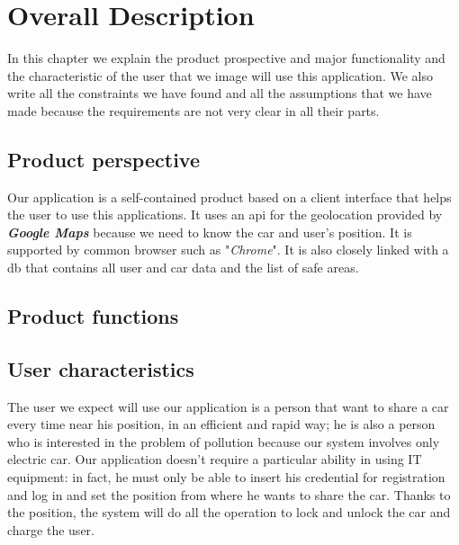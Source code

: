 \section{Overall Description} \label{sec:description}
In this chapter we explain the product prospective and major functionality and the characteristic of the user that we image will use this application. We also write all the constraints we have found and all the assumptions that we have made because the requirements are not very clear in all their parts. 

\subsection{Product perspective} \label{subsec:prod_persp}
Our application is a self-contained product based on a client interface that helps the user to use this applications. It uses an \acs{api} for the geolocation provided by \emph{\textbf{Google Maps}} because we need to know the car and user's position. It is supported by common browser such as "\emph{Chrome}". It is also closely linked with a \acs{db} that contains all user and car data and the list of safe areas.



\subsection{Product functions} \label{subsec:prod_funct}


\subsection{User characteristics} \label{subsec:user_char}
The user we expect will use our application is a person that want to share a car every time near his position, in an efficient and rapid way; he is also a person who is interested in the problem of pollution because our system involves only electric car. Our application doesn't require a particular ability in using IT equipment: in fact, he must only be able to insert his credential for registration and log in and set the position from where he wants to share the car. Thanks to the position, the system will do all the operation to lock and unlock the car and charge the user.


